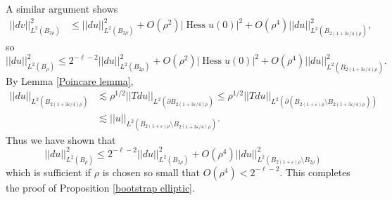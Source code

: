 \documentclass[reqno,12pt,letterpaper]{amsart}
\DeclareMathOperator{\Hess}{Hess}
\theoremstyle{definition}
\numberwithin{equation}{section}
\begin{document}
A similar argument shows
\begin{align*}
||dv||_{L^2(B_{2\rho})}^2 &\leq ||du||_{L^2(B_{2\rho})}^2 + O(\rho^2) |\Hess u(0)|^2 + O(\rho^4) ||du||_{L^2(B_{2(1 + 3\varepsilon/4)\rho})}^2,
\end{align*}
so
$$||du||_{L^2(B_\rho)}^2 \leq 2^{-\ell-2}||du||_{L^2(B_{2\rho})}^2 + O(\rho^2) |\Hess u(0)|^2 + O(\rho^4) ||du||_{L^2(B_{2(1 + 3\varepsilon/4)\rho})}^2.$$
By Lemma \ref{Poincare lemma},
\begin{align*}
||du||_{L^2(B_{2(1 + 3\varepsilon/4)\rho})} &\lesssim \rho^{1/2} ||Tdu||_{L^2(\partial B_{2(1 + 3\varepsilon/4)\rho})}
 \leq \rho^{1/2} ||Tdu||_{L^2(\partial(B_{2(1 + \varepsilon)\rho} \setminus B_{2(1 + 3\varepsilon/4)\rho}))} \\
&\lesssim ||u||_{L^2(B_{2(1 + \varepsilon)\rho} \setminus B_{2(1 + 3\varepsilon/4)\rho})}.
\end{align*}
Thus we have shown that
$$||du||_{L^2(B_\rho)}^2 \leq 2^{-\ell-2}||du||_{L^2(B_{2\rho})}^2 + O(\rho^4) ||du||_{L^2(B_{2(1 + \varepsilon)\rho} \setminus B_{2\rho})}^2$$
which is sufficient if $\rho$ is chosen so small that $O(\rho^4) < 2^{-\ell-2}$.
This completes the proof of Proposition \ref{bootstrap elliptic}.
\end{document}
